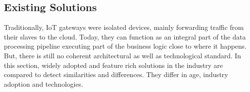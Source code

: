 \subsection{Existing Solutions} \label{sec:existingSolutions}

Traditionally, IoT gateways were isolated devices, mainly forwarding traffic from their slaves to the cloud. Today, they can function as an integral part of the data processing pipeline executing part of the business logic close to where it happens. But, there is still no coherent architectural as well as technological standard. In this section, widely adopted and feature rich solutions in the industry are compared to detect similarities and differences. They differ in age, industry adoption and technologies.



